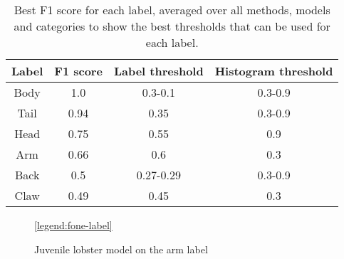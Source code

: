 \begin{table}[H]
\centering
\begin{tabular}{| c | c | c | c |}
\hline
\textbf{Label} & \textbf{F1 score} & \textbf{Label threshold} & \textbf{Histogram threshold} \\
\hline
Body & 1.0 & 0.3-0.1 & 0.3-0.9 \\
Tail & 0.94 & 0.35 & 0.3-0.9 \\
Head & 0.75 & 0.55 & 0.9 \\
Arm & 0.66 & 0.6 & 0.3 \\
Back & 0.5 & 0.27-0.29 & 0.3-0.9 \\
Claw & 0.49 & 0.45 & 0.3 \\
\hline
\end{tabular}
\caption{Best F1 score for each label, averaged over all methods, models and categories to show the best thresholds that can be used for each label.}
\label{tbl:avg-f1}
\end{table}

 
\newcommand{\fonelabelplot}[6] {
\addplot+[mark=none,
	discard if not={Method}{#1},
	discard if not={Model}{#2},
	discard if not={Category}{#3},
	discard if not={HistThreshold}{#4},
	discard if not={Label}{#5}
] table [x=LabelThreshold, y=F1, col sep=comma] {\resultspath/kp-labelling.csv};
\addlegendentry{#6}
}

\newcommand{\fonelabelgraph}[4]{
\begin{tikzpicture}[scale=0.75]
\begin{axis}[
	title = {\textbf{Histogram threshold of #2}},
	legend pos=outer north east,
	legend entries={
		Graph method on mature lobsters;,
		Label method on mature lobsters;,
		Graph method on juvenile lobsters;,
		Label method on juvenile lobsters
	},
	legend to name=#4,
	xlabel={Label threshold},
	xmin=0,xmax=1,
	ylabel={F1 score},
	ymin=0,ymax=1
]

\fonelabelplot{graph}{#1}{mature}{#2}{#3}{Graph method on mature lobsters}
\fonelabelplot{model}{#1}{mature}{#2}{#3}{Label method on mature lobsters}
\fonelabelplot{graph}{#1}{juvenile}{#2}{#3}{Graph method on juvenile lobsters}
\fonelabelplot{model}{#1}{juvenile}{#2}{#3}{Label method on juvenile lobsters}
\end{axis}
\end{tikzpicture}
}

\begin{figure}[H]
\centering
{}
\ref{legend:fone-label}
\caption{Juvenile lobster model on the arm label}
\label{fig:fone-juv-arm}
\end{figure}

